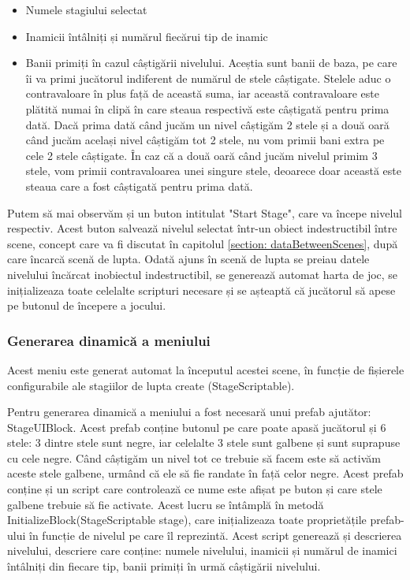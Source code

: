 \documentclass[12pt, a4paper]{article}
\begin{document}
	\begin{itemize}
		\item Numele stagiului selectat
		\item Inamicii întâlniți și numărul fiecărui tip de inamic
		\item Banii primiți în cazul câștigării nivelului. Aceștia sunt banii de baza, pe care îi va primi jucătorul indiferent de numărul de stele câștigate. Stelele aduc o contravaloare în plus față de această suma, iar această contravaloare este plătită numai în clipă în care steaua respectivă este câștigată pentru prima dată. Dacă prima dată când jucăm un nivel câștigăm 2 stele și a două oară când jucăm același nivel câștigăm tot 2 stele, nu vom primii bani extra pe cele 2 stele câștigate. În caz că a două oară când jucăm nivelul primim 3 stele, vom primii contravaloarea unei singure stele, deoarece doar această este steaua care a fost câștigată pentru prima dată.
	\end{itemize}
	
	Putem să mai observăm și un buton intitulat "Start Stage", care va începe nivelul respectiv. Acest buton salvează nivelul selectat într-un obiect indestructibil între scene, concept care va fi discutat în capitolul \ref{section: dataBetweenScenes}, după care încarcă scenă de lupta. Odată ajuns în scenă de lupta se preiau datele nivelului încărcat inobiectul indestructibil, se generează automat harta de joc, se inițializeaza toate celelalte scripturi necesare și se așteaptă că jucătorul să apese pe butonul de începere a jocului.
	\newline
	
	\subsubsection{Generarea dinamică a meniului}
	
	Acest meniu este generat automat la începutul acestei scene, în funcție de fișierele configurabile ale stagiilor de lupta create (StageScriptable).
	\newline
	
	Pentru generarea dinamică a meniului a fost necesară unui prefab ajutător: StageUIBlock. Acest prefab conține butonul pe care poate apasă jucătorul și 6 stele: 3 dintre stele sunt negre, iar celelalte 3 stele sunt galbene și sunt suprapuse cu cele negre. Când câștigăm un nivel tot ce trebuie să facem este să activăm aceste stele galbene, urmând că ele să fie randate în față celor negre. Acest prefab conține și un script care controlează ce nume este afișat pe buton și care stele galbene trebuie să fie activate. Acest lucru se întâmplă în metodă InitializeBlock(StageScriptable stage), care inițializeaza toate proprietățile prefab-ului în funcție de nivelul pe care îl reprezintă. Acest script generează și descrierea nivelului, descriere care conține: numele nivelului, inamicii și numărul de inamici întâlniți din fiecare tip, banii primiți în urmă câștigării nivelului.
	\newline
	
\end{document}

